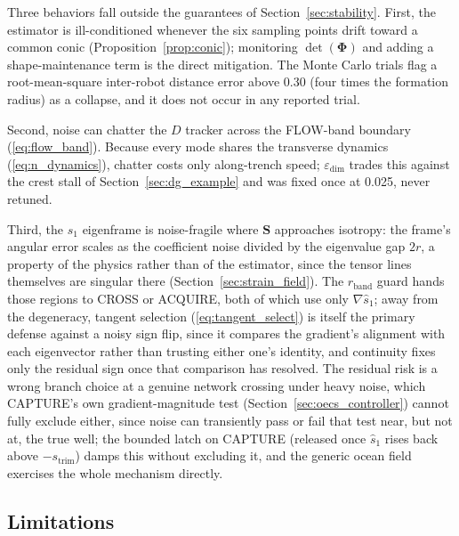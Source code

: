 \documentclass[lettersize,journal]{IEEEtran}
\begin{document}
Three behaviors fall outside the guarantees of
Section~\ref{sec:stability}. First, the estimator is ill-conditioned
whenever the six sampling points drift toward a common conic
(Proposition~\ref{prop:conic}); monitoring $\det(\boldsymbol{\Phi})$
and adding a shape-maintenance term is the direct mitigation. The Monte
Carlo trials flag a root-mean-square inter-robot distance error above
0.30 (four times the formation radius) as a collapse, and it does not
occur in any reported trial.

Second, noise can chatter the $D$ tracker across the FLOW-band
boundary (\ref{eq:flow_band}). Because every mode shares the
transverse dynamics (\ref{eq:n_dynamics}), chatter costs only
along-trench speed; $\varepsilon_{\text{dim}}$ trades this against the
crest stall of Section~\ref{sec:dg_example} and was fixed once at
0.025, never retuned.

Third, the $s_1$ eigenframe is noise-fragile where $\mathbf{S}$
approaches isotropy: the frame's angular error scales as the
coefficient noise divided by the eigenvalue gap $2r$, a property of
the physics rather than of the estimator, since the tensor lines
themselves are singular there (Section~\ref{sec:strain_field}). The
$r_{\text{band}}$ guard hands those regions to CROSS or
ACQUIRE, both of which use only $\nabla\hat{s}_1$; away from the
degeneracy, tangent selection (\ref{eq:tangent_select}) is itself the
primary defense against a noisy sign flip, since it compares the
gradient's alignment with each eigenvector rather than trusting either
one's identity, and continuity fixes only the residual sign once that
comparison has resolved. The residual risk is a wrong branch choice at
a genuine network crossing under heavy noise, which CAPTURE's own
gradient-magnitude test (Section~\ref{sec:oecs_controller}) cannot
fully exclude either, since noise can transiently pass or fail that
test near, but not at, the true well; the bounded latch on CAPTURE
(released once $\hat{s}_1$ rises back above $-s_{\text{trim}}$) damps
this without excluding it, and the generic ocean field exercises the
whole mechanism directly.

\subsection{Limitations}
\label{sec:limitations}
\end{document}
